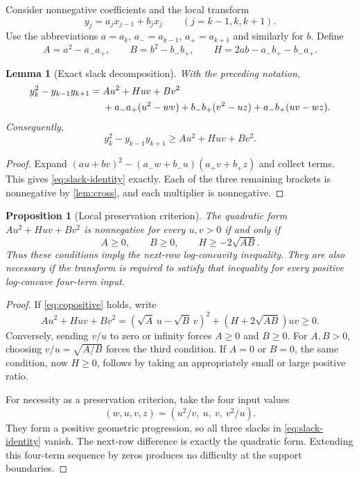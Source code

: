 \documentclass[11pt,a4paper]{article}
\numberwithin{equation}{section}
\newtheorem{lemma}[lemma]{Lemma}
\newtheorem{proposition}[proposition]{Proposition}
\theoremstyle{definition}
\theoremstyle{remark}
\begin{document}
Consider nonnegative coefficients and the local transform
\begin{equation}\label{eq:local-transform}
 y_j=a_jx_{j-1}+b_jx_j\qquad (j=k-1,k,k+1).
\end{equation}
Use the abbreviations $a=a_k$, $a_-=a_{k-1}$, $a_+=a_{k+1}$ and similarly
for $b$. Define
\begin{equation}\label{eq:ABH}
 A=a^2-a_-a_+,\qquad B=b^2-b_-b_+,\qquad
 H=2ab-a_-b_+-b_-a_+.
\end{equation}

\begin{lemma}[Exact slack decomposition]\label{lem:slacks}
With the preceding notation,
\begin{align}
 y_k^2-y_{k-1}y_{k+1}
  ={}& Au^2+Huv+Bv^2 \notag\\
    &+a_-a_+(u^2-wv)+b_-b_+(v^2-uz)
       +a_-b_+(uv-wz).\label{eq:slack-identity}
\end{align}
Consequently,
\begin{equation}\label{eq:quadratic-bound}
 y_k^2-y_{k-1}y_{k+1}\ge Au^2+Huv+Bv^2.
\end{equation}
\end{lemma}
\begin{proof}
Expand $(au+bv)^2-(a_-w+b_-u)(a_+v+b_+z)$ and collect terms.
This gives \eqref{eq:slack-identity} exactly. Each of the three remaining
brackets is nonnegative by \cref{lem:cross}, and each multiplier
is nonnegative.
\end{proof}

\begin{proposition}[Local preservation criterion]\label{prop:copositive}
The quadratic form $Au^2+Huv+Bv^2$ is nonnegative for every $u,v>0$
if and only if
\begin{equation}\label{eq:copositive}
 A\ge0,\qquad B\ge0,\qquad H\ge-2\sqrt{AB}.
\end{equation}
Thus these conditions imply the next-row log-concavity inequality.
They are also necessary if the transform is required to satisfy that
inequality for every positive log-concave four-term input.
\end{proposition}
\begin{proof}
If \eqref{eq:copositive} holds, write
\[
 Au^2+Huv+Bv^2=(\sqrt A\,u-\sqrt B\,v)^2
                         +(H+2\sqrt{AB})uv\ge0.
\]
Conversely, sending $v/u$ to zero or infinity forces $A\ge0$ and $B\ge0$.
For $A,B>0$, choosing $v/u=\sqrt{A/B}$ forces the third condition.
If $A=0$ or $B=0$, the same condition, now $H\ge0$, follows by taking
an appropriately small or large positive ratio.

For necessity as a preservation criterion, take the four input values
\[
 (w,u,v,z)=(u^2/v,\ u,\ v,\ v^2/u).
\]
They form a positive geometric progression, so all three slacks in
\eqref{eq:slack-identity} vanish. The next-row difference is exactly the
quadratic form. Extending this four-term sequence by zeros produces
no difficulty at the support boundaries.
\end{proof}
\end{document}
